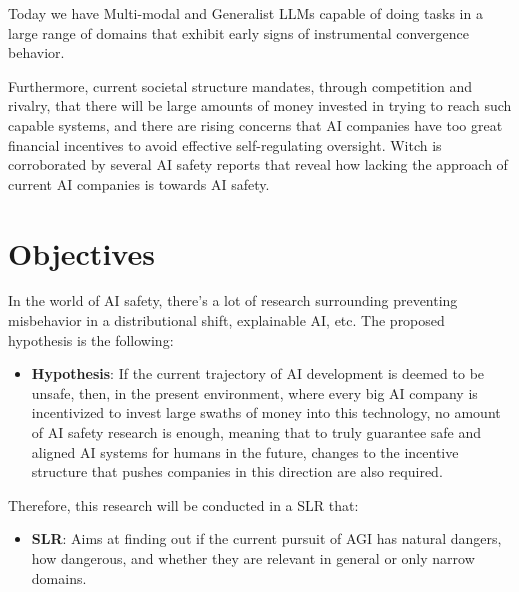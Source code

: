 \begin{toreview}
	Today we have Multi-modal and Generalist LLMs capable of doing tasks in a large range of domains that exhibit early signs of instrumental convergence behavior\cite{greenblatt_alignment_faking}.

	Furthermore, current societal structure mandates, through competition and rivalry, that there will be large amounts of money invested in trying to reach such capable systems, and there are rising concerns that AI companies have too great financial incentives to avoid effective self-regulating oversight\cite{hemphill_advanced_2025}. Witch is corroborated by several AI safety reports that reveal how lacking the approach of current AI companies is towards AI safety\cite{FLIAISafetyIndex2025}\cite{AISafetyReport2025}.



\end{toreview}

\section{Objectives}

In the world of AI safety, there's a lot of research surrounding preventing misbehavior in a distributional shift, explainable AI, etc. The proposed hypothesis is the following:
\begin{itemize}
	\item \textbf{Hypothesis}: If the current trajectory of AI development is deemed to be unsafe, then, in the present environment, where every big AI company is incentivized to invest large swaths of money into this technology, no amount of AI safety research is enough, meaning that to truly guarantee safe and aligned AI systems for humans in the future, changes to the incentive structure that pushes companies in this direction are also required.
\end{itemize}
Therefore, this research will be conducted in a SLR that:
\begin{itemize}
	\item \textbf{SLR}: Aims at finding out if the current pursuit of AGI has natural dangers, how dangerous, and whether they are relevant in general or only narrow domains.
\end{itemize}

